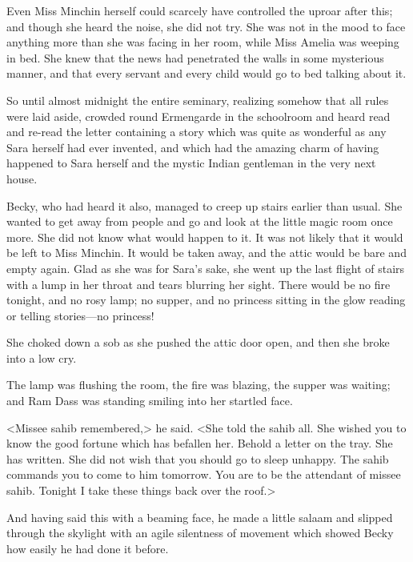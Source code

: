 Even Miss Minchin herself could scarcely have controlled the uproar after this; and though she heard the noise, she did not try. She was not in the mood to face anything more than she was facing in her room, while Miss Amelia was weeping in bed. She knew that the news had penetrated the walls in some mysterious manner, and that every servant and every child would go to bed talking about it.

So until almost midnight the entire seminary, realizing somehow that all rules were laid aside, crowded round Ermengarde in the schoolroom and heard read and re-read the letter containing a story which was quite as wonderful as any Sara herself had ever invented, and which had the amazing charm of having happened to Sara herself and the mystic Indian gentleman in the very next house.

Becky, who had heard it also, managed to creep up stairs earlier than usual. She wanted to get away from people and go and look at the little magic room once more. She did not know what would happen to it. It was not likely that it would be left to Miss Minchin. It would be taken away, and the attic would be bare and empty again. Glad as she was for Sara's sake, she went up the last flight of stairs with a lump in her throat and tears blurring her sight. There would be no fire tonight, and no rosy lamp; no supper, and no princess sitting in the glow reading or telling stories—no princess!

She choked down a sob as she pushed the attic door open, and then she broke into a low cry.

The lamp was flushing the room, the fire was blazing, the supper was waiting; and Ram Dass was standing smiling into her startled face.

<Missee sahib remembered,> he said. <She told the sahib all. She wished you to know the good fortune which has befallen her. Behold a letter on the tray. She has written. She did not wish that you should go to sleep unhappy. The sahib commands you to come to him tomorrow. You are to be the attendant of missee sahib. Tonight I take these things back over the roof.>

And having said this with a beaming face, he made a little salaam and slipped through the skylight with an agile silentness of movement which showed Becky how easily he had done it before.